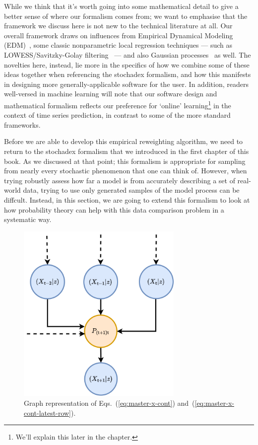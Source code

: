 While we think that it's worth going into some mathematical detail to give a better sense of where our formalism comes from; we want to emphasise that the framework we discuss here is not new to the technical literature at all. Our overall framework draws on influences from Empirical Dynamical Modeling (EDM)~\cite{sugihara1990nonlinear}, some classic nonparametric local regression techniques --- such as LOWESS/Savitzky-Golay filtering~\cite{savitzky1964smoothing} --- and also Gaussian processes~\cite{murphy2012machine} as well. The novelties here, instead, lie more in the specifics of how we combine some of these ideas together when referencing the stochadex formalism, and how this manifests in designing more generally-applicable software for the user. In addition, readers well-versed in machine learning will note that our software design and mathematical formalism reflects our preference for `online' learning\footnote{We'll explain this later in the chapter.} in the context of time series prediction, in contrast to some of the more standard frameworks.

Before we are able to develop this empirical reweighting algorithm, we need to return to the stochadex formalism that we introduced in the first chapter of this book. As we discussed at that point; this formalism is appropriate for sampling from nearly every stochastic phenomenon that one can think of. However, when trying robustly assess how far a model is from accurately describing a set of real-world data, trying to use only generated samples of the model process can be diffcult. Instead, in this section, we are going to extend this formalism to look at how probability theory can help with this data comparison problem in a systematic way.

\begin{figure}[h]
\centering
\includegraphics[width=8cm]{images/chapter-3-master-eq-graph.drawio.png}
\caption{Graph representation of Eqs.~(\ref{eq:master-x-cont}) and~(\ref{eq:master-x-cont-latest-row}).}
\label{fig:master-eqn}
\end{figure} 

